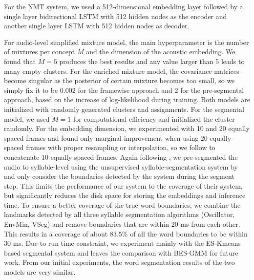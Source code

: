 \documentclass[journal]{IEEEtran}
\begin{document}
For the NMT system, we used a 512-dimensional embedding layer followed by a single layer bidirectional LSTM with 512 hidden nodes as the encoder and another single layer LSTM with 512 hidden nodes as decoder. %

For audio-level simplified mixture model, the main hyperparameter is the number of mixtures per concept $M$ and the dimension of the acoustic embedding. We found that $M=5$ produces the best results and any value larger than 5 leads to many empty clusters. For the enriched mixture model, the covariance matrices become singular as the posterior of certain mixture becomes too small, so we simply fix it to be $0.002$ for the framewise approach and $2$ for the pre-segmental approach, based on the increase of log-likelihood during training. Both models are initialized with randomly generated clusters and assignments. For the segmental model, we used $M=1$ for computational efficiency and initialized the cluster randomly. For the embedding dimension, we experimented with 10 and 20 equally spaced frames and found only marginal improvement when using 20 equally spaced frames  with proper resampling or interpolation, so we follow \cite{Kamper2017} to concatenate 10 equally spaced frames. 
Again following \cite{Kamper2016}, we pre-segmented the audio to syllable-level using the unsupervised syllable-segmentation system by \cite{Rasanen2015} and only consider the boundaries detected by the system during the segment step. This limits the performance of our system to the coverage of their system, but significantly reduces the disk space for storing the embeddings and inference time. To ensure a better coverage of the true word boundaries, we combine the landmarks detected by all three syllable segmentation algorithms (Oscillator, EnvMin, VSeg) \cite{Rasanen2015} and remove boundaries that are within 20 ms from each other. This results in a coverage of about $83.5 \%$ of all the word boundaries to be within 30 ms. Due to run time constraint, we experiment mainly with the ES-Kmeans based segmental system and leaves the comparison with BES-GMM for future work. From our initial experiments, the word segmentation results of the two models are very similar.
\end{document}
